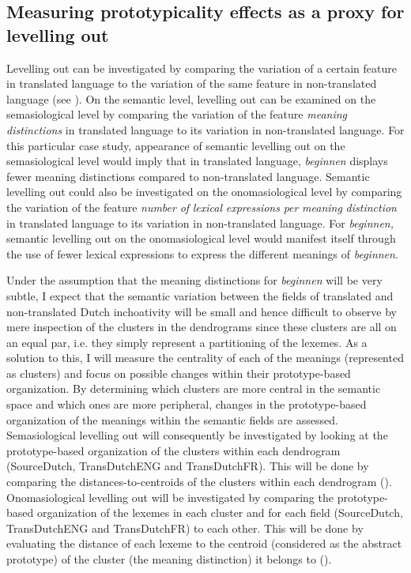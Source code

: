 \subsection{\label{sec:3.8.1}  Measuring prototypicality effects as a proxy for levelling out}

Levelling out can be investigated by comparing the variation of a certain feature in translated language to the variation of the same feature in non-translated language (see ). On the semantic level, levelling out can be examined on the semasiological level by comparing the variation of the feature \textit{meaning} \textit{distinctions} in translated language to its variation in non-translated language. For this particular case study, appearance of semantic levelling out on the semasiological level would imply that in translated language, \textit{beginnen} displays fewer meaning distinctions compared to non-translated language. Semantic levelling out could also be investigated on the onomasiological level by comparing the variation of the feature \textit{number} \textit{of} \textit{lexical} \textit{expressions} \textit{per} \textit{meaning} \textit{distinction} in translated language to its variation in non-translated language. For \textit{beginnen,} semantic levelling out on the onomasiological level would manifest itself through the use of fewer lexical expressions to express the different meanings of \textit{beginnen}.



Under the assumption that the meaning distinctions for \textit{beginnen} will be very subtle, I expect that the semantic variation between the fields of translated and non-translated Dutch inchoativity will be small and hence difficult to observe by mere inspection of the clusters in the dendrograms since these clusters are all on an equal par, i.e. they simply represent a partitioning of the lexemes. As a solution to this, I will measure the centrality of each of the meanings (represented as clusters) and focus on possible changes within their prototype-based organization. By determining which clusters are more central in the semantic space and which ones are more peripheral, changes in the prototype-based organization of the meanings within the semantic fields are assessed. Semasiological levelling out will consequently be investigated by looking at the prototype-based organization of the clusters within each dendrogram (SourceDutch, TransDutchENG and TransDutchFR). This will be done by comparing the distances-to-centroids of the clusters within each dendrogram (). Onomasiological levelling out will be investigated by comparing the prototype-based organization of the lexemes in each cluster and for each field (SourceDutch, TransDutchENG and TransDutchFR) to each other. This will be done by evaluating the distance of each lexeme to the centroid (considered as the abstract prototype) of the cluster (the meaning distinction) it belongs to ().



